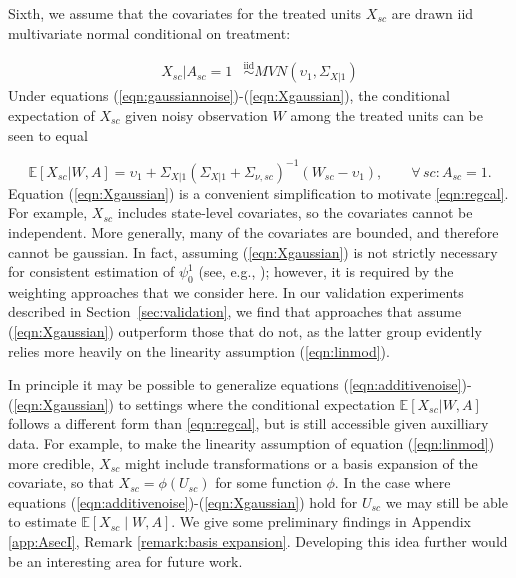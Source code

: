 \documentclass[aoas]{imsart}
\theoremstyle{plain}
\theoremstyle{remark}
\begin{document}
Sixth, we assume that the covariates for the treated units $X_{sc}$ are drawn iid multivariate normal conditional on treatment:

\begin{align} \label{eqn:Xgaussian}
    X_{sc}|A_{sc} = 1 & \stackrel{\text{iid}}{\sim} MVN(\upsilon_1, \Sigma_{X|1})%
\end{align}
%
Under equations (\ref{eqn:gaussiannoise})-(\ref{eqn:Xgaussian}), the conditional expectation of $X_{sc}$ given noisy observation $W$ among the treated units can be seen to equal 

\begin{equation} \label{eqn:regcal}
\mathbb{E}[X_{sc}| W, A] = \upsilon_1 + \Sigma_{X|1} \left(\Sigma_{X|1} + \Sigma_{\nu, sc}\right)^{-1}  (W_{sc} - \upsilon_1), \qquad \forall\, sc: A_{sc} = 1.
\end{equation}
%
Equation (\ref{eqn:Xgaussian}) is a convenient simplification to motivate \eqref{eqn:regcal}. For example, $X_{sc}$ includes state-level covariates, so the covariates cannot be independent. More generally, many of the covariates are bounded, and therefore cannot be gaussian. In fact, assuming (\ref{eqn:Xgaussian}) is not strictly necessary for consistent estimation of $\psi_0^1$ (see, e.g., \cite{gleser1992importance}); however, it is required by the weighting approaches that we consider here. In our validation experiments described in Section~\ref{sec:validation}, we find that approaches that assume (\ref{eqn:Xgaussian}) outperform those that do not, as the latter group evidently relies more heavily on the linearity assumption (\ref{eqn:linmod}).

In principle it may be possible to generalize equations (\ref{eqn:additivenoise})-(\ref{eqn:Xgaussian}) to settings where the conditional expectation $\mathbb{E}[X_{sc}|W,A]$ follows a different form than \eqref{eqn:regcal}, but is still accessible given auxilliary data. For example, to make the linearity assumption of equation (\ref{eqn:linmod}) more credible, $X_{sc}$ might include transformations or a basis expansion of the covariate, so that $X_{sc} = \phi(U_{sc})$ for some function $\phi$. In the case where equations (\ref{eqn:additivenoise})-(\ref{eqn:Xgaussian}) hold for $U_{sc}$ we may still be able to estimate $\mathbb{E}[X_{sc} \mid W, A]$. We give some preliminary findings in Appendix \ref{app:AsecI}, Remark \ref{remark:basis expansion}. Developing this idea further would be an interesting area for future work.
 
\end{document}
